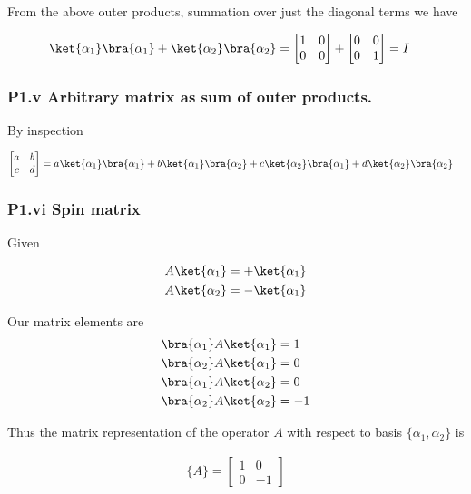From the above outer products, summation over just the diagonal terms we have

\begin{align*}
\ket{\alpha_1}\bra{\alpha_1} + \ket{\alpha_2}\bra{\alpha_2} &=
\begin{bmatrix}
1 & 0 \\
0 & 0
\end{bmatrix} +
\begin{bmatrix}
0 & 0 \\
0 & 1
\end{bmatrix} 
= I
\end{align*}

\subsubsection{P1.v Arbitrary matrix as sum of outer products.}

By inspection

\begin{align*}
\begin{bmatrix}
a & b \\
c & d
\end{bmatrix} 
&=
a \ket{\alpha_1}\bra{\alpha_1} 
+b \ket{\alpha_1}\bra{\alpha_2} 
+c \ket{\alpha_2}\bra{\alpha_1} 
+d \ket{\alpha_2}\bra{\alpha_2}
\end{align*}

\subsubsection{P1.vi Spin matrix}

Given

\begin{align*}
A \ket{\alpha_1} &= + \ket{\alpha_1} \\
A \ket{\alpha_2} &= - \ket{\alpha_1}
\end{align*}

Our matrix elements are
\begin{align*}
\bra{\alpha_1} A \ket{\alpha_1} &= 1 \\
\bra{\alpha_2} A \ket{\alpha_1} &= 0 \\
\bra{\alpha_1} A \ket{\alpha_2} &= 0 \\
\bra{\alpha_2} A \ket{\alpha_2} &= -1
\end{align*}

Thus the matrix representation of the operator $A$ with respect to basis $\{\alpha_1, \alpha_2\}$ is

\begin{align*}
\{A\} =
\begin{bmatrix}
1 & 0 \\
0 & -1
\end{bmatrix} 
\end{align*}

